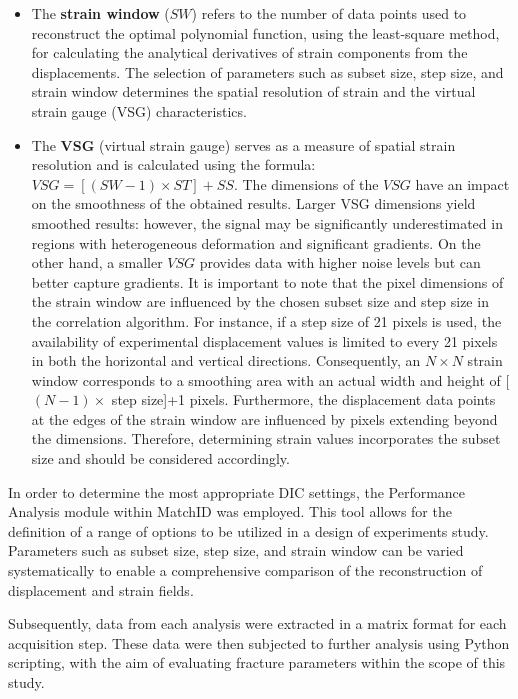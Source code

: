 \begin{itemize}
	\item The \textbf{strain window} ($SW$) refers to the number of data points used to reconstruct the optimal polynomial function, using the least-square method, for calculating the analytical derivatives of strain components from the displacements. The selection of parameters such as subset size, step size, and strain window determines the spatial resolution of strain and the virtual strain gauge (VSG) characteristics.
	\item The \textbf{VSG} (virtual strain gauge) serves as a measure of spatial strain resolution and is calculated using the formula: $VSG=[(SW-1)\times ST] + SS$. The dimensions of the $VSG$ have an
    impact on the smoothness of the obtained results. Larger VSG dimensions yield smoothed results: however, the signal may be significantly underestimated in regions with heterogeneous deformation and
    significant gradients. On the other hand, a smaller $VSG$ provides data with higher noise levels but can better capture gradients. It is important to note that the pixel dimensions of the strain window are influenced by the chosen subset size and step size in the correlation algorithm. For instance, if a step size of 21 pixels is used, the availability of experimental displacement values is limited to every 21 pixels in both the horizontal and vertical directions. Consequently, an $N \times N$ strain window corresponds to a smoothing area with an actual width and height of
	[$(N-1) \times $ step size]+1 pixels. Furthermore, the displacement data points at the edges of the strain window are influenced by pixels extending beyond the dimensions. Therefore, determining strain values incorporates the subset size and should be considered accordingly.
\end{itemize}

In order to determine the most appropriate DIC settings, the Performance Analysis module within MatchID was employed. This tool allows for the definition of a range of options to be utilized in a design of experiments study. Parameters such as subset size, step size, and strain window can be varied systematically to enable a comprehensive comparison of the reconstruction of displacement and strain fields.

Subsequently, data from each analysis were extracted in a matrix format for each acquisition step. These data were then subjected to further analysis using Python scripting, with the aim of evaluating fracture parameters within the scope of this study.


